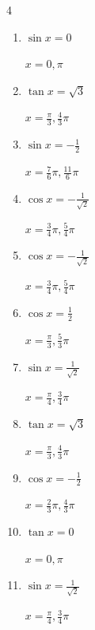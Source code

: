 \begin{multicols}{4}
\begin{enumerate}
        $\displaystyle x = \frac{7}{6}\pi , \frac{11}{6}\pi$

\columnbreak %

  \item $\displaystyle \sin{x}  = 0$

        $\displaystyle x = 0 , \pi$

  \item $\displaystyle \tan{x}  = \sqrt{3}$

        $\displaystyle x = \frac{\pi}{3} , \frac{4}{3}\pi$

  \item $\displaystyle \sin{x}  = -\frac{1}{2}$

        $\displaystyle x = \frac{7}{6}\pi , \frac{11}{6}\pi$

  \item $\displaystyle \cos{x}  = -\frac{1}{\sqrt{2}}$

        $\displaystyle x = \frac{3}{4}\pi , \frac{5}{4}\pi$

  \item $\displaystyle \cos{x}  = -\frac{1}{\sqrt{2}}$

        $\displaystyle x = \frac{3}{4}\pi , \frac{5}{4}\pi$

  \item $\displaystyle \cos{x}  = \frac{1}{2}$

        $\displaystyle x = \frac{\pi}{3} , \frac{5}{3}\pi$

  \item $\displaystyle \sin{x}  = \frac{1}{\sqrt{2}}$

        $\displaystyle x = \frac{\pi}{4} , \frac{3}{4}\pi$

  \item $\displaystyle \tan{x}  = \sqrt{3}$

        $\displaystyle x = \frac{\pi}{3} , \frac{4}{3}\pi$

  \item $\displaystyle \cos{x}  = -\frac{1}{2}$

        $\displaystyle x = \frac{2}{3}\pi , \frac{4}{3}\pi$

  \item $\displaystyle \tan{x}  = 0$

        $\displaystyle x = 0 , \pi$

  \item $\displaystyle \sin{x}  = \frac{1}{\sqrt{2}}$

        $\displaystyle x = \frac{\pi}{4} , \frac{3}{4}\pi$


\end{enumerate}
\end{multicols}
